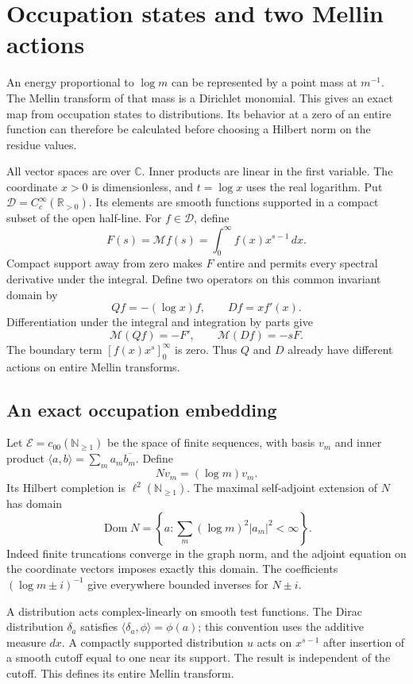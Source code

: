 \chapter{Occupation states and two Mellin actions}

An energy proportional to $\log m$ can be represented by a point
mass at $m^{-1}$. The Mellin transform of that mass is a Dirichlet
monomial. This gives an exact map from occupation states to
distributions. Its behavior at a zero of an entire function can
therefore be calculated before choosing a Hilbert norm on the
residue values.

All vector spaces are over $\mathbb C$. Inner products are linear
in the first variable. The coordinate $x>0$ is dimensionless,
and $t=\log x$ uses the real logarithm. Put
$\mathscr D=C_c^\infty(\mathbb R_{>0})$. Its elements are smooth
functions supported in a compact subset of the open half-line.
For $f\in\mathscr D$, define
\[
 F(s)=\mathcal Mf(s)=\int_0^\infty f(x)x^{s-1}\,dx.
\]
Compact support away from zero makes $F$ entire and permits every
spectral derivative under the integral. Define two operators on
this common invariant domain by
\[
 Qf=-(\log x)f,\qquad Df=x f'(x).
\]
Differentiation under the integral and integration by parts give
\begin{equation}
 \mathcal M(Qf)=-F',\qquad \mathcal M(Df)=-sF.
 \label{mo:two-actions}
\end{equation}
The boundary term $[f(x)x^s]_0^\infty$ is zero. Thus $Q$ and $D$
already have different actions on entire Mellin transforms.

\section{An exact occupation embedding}

Let $\mathscr E=c_{00}(\mathbb N_{\geq1})$ be the space of finite
sequences, with basis $v_m$ and inner product
$\langle a,b\rangle=\sum_m a_m\overline{b_m}$. Define
\[
 Nv_m=(\log m)v_m.
\]
Its Hilbert completion is $\ell^2(\mathbb N_{\geq1})$. The maximal
self-adjoint extension of $N$ has domain
\[
 \operatorname{Dom}N=
 \left\{a:\sum_m(\log m)^2|a_m|^2<\infty\right\}.
\]
Indeed finite truncations converge in the graph norm, and the
adjoint equation on the coordinate vectors imposes exactly this
domain. The coefficients $(\log m\pm i)^{-1}$ give everywhere
bounded inverses for $N\pm i$.

A distribution acts complex-linearly on smooth test functions.
The Dirac distribution $\delta_a$ satisfies
$\langle\delta_a,\phi\rangle=\phi(a)$; this convention uses the
additive measure $dx$. A compactly supported distribution $u$
acts on $x^{s-1}$ after insertion of a smooth cutoff equal to one
near its support. The result is independent of the cutoff. This
defines its entire Mellin transform.

